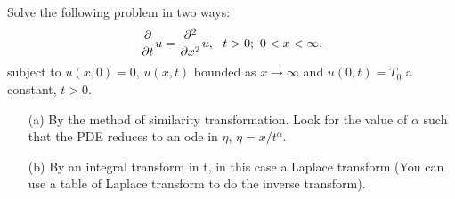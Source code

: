 \documentclass[12pt]{report}
\begin{document}
\newpage



\begin{problem}
    Solve the following problem in two ways:
    \[ 
        \frac{\partial }{\partial t}u = \frac{\partial^{2} }{\partial x^{2}}u, ~~ t>0; ~0<x<\infty,
    \]
    subject to $u(x,0)=0$, $u(x,t)$ bounded as $x\to \infty$ and $u(0,t) = T_0$ a constant, $t>0$.
    \begin{enumerate}
        \item [(a)]
        By the method of similarity transformation. Look for the value of $\alpha$ such that the PDE reduces to an ode in $\eta$, $\eta = x/t^\alpha$.


        \item [(b)]
        By an integral transform in t, in this case a Laplace transform (You can use a table of Laplace transform to do the inverse transform).
    
    \end{enumerate}
\end{problem}
\end{document}
